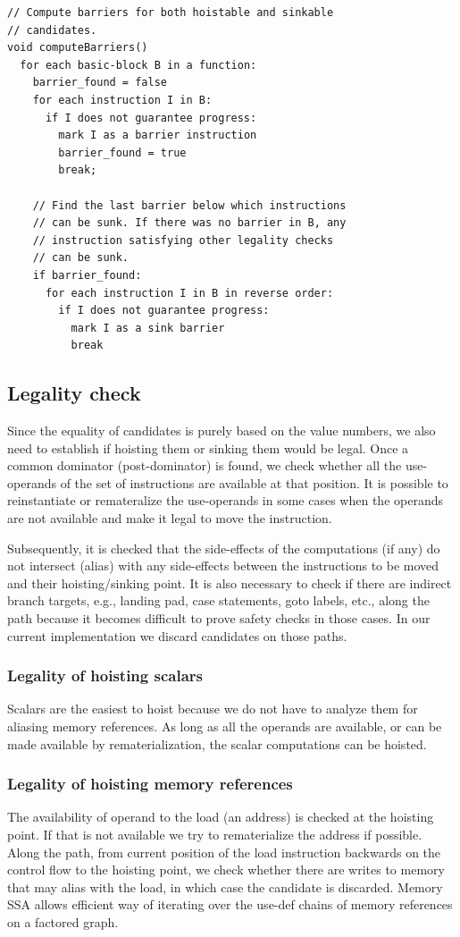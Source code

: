 \documentclass[sigplan,10pt,review,anonymous]{acmart}\settopmatter{printfolios=true,printccs=false,printacmref=false}
\begin{document}
\begin{verbatim}
// Compute barriers for both hoistable and sinkable
// candidates.
void computeBarriers()
  for each basic-block B in a function:
    barrier_found = false
    for each instruction I in B:
      if I does not guarantee progress:
        mark I as a barrier instruction
        barrier_found = true
        break;

    // Find the last barrier below which instructions
    // can be sunk. If there was no barrier in B, any
    // instruction satisfying other legality checks
    // can be sunk.
    if barrier_found:
      for each instruction I in B in reverse order:
        if I does not guarantee progress:
          mark I as a sink barrier
          break
\end{verbatim}

\subsection{Legality check}
\label{subsec:legality}
Since the equality of candidates is purely based on the value numbers, we also
need to establish if hoisting them or sinking them would be legal. Once a common
dominator (post-dominator) is found, we check whether all the use-operands of
the set of instructions are available at that position. It is possible to
reinstantiate or remateralize the use-operands in some cases when the operands
are not available and make it legal to move the instruction.

Subsequently, it is checked that the side-effects of the computations (if any)
do not intersect (alias) with any side-effects between the instructions to be
moved and their hoisting/sinking point. It is also necessary to check if there
are indirect branch targets, e.g., landing pad, case statements, goto labels,
etc., along the path because it becomes difficult to prove safety checks in
those cases. In our current implementation we discard candidates on those paths.

\subsubsection{Legality of hoisting scalars}
Scalars are the easiest to hoist because we do not have to analyze them for
aliasing memory references. As long as all the operands are available, or can be
made available by rematerialization, the scalar computations can be hoisted.

\subsubsection{Legality of hoisting memory references}
The availability of operand to the load (an address) is checked at the hoisting
point. If that is not available we try to rematerialize the address if possible.
Along the path, from current position of the load instruction backwards on the
control flow to the hoisting point, we check whether there are writes to memory
that may alias with the load, in which case the candidate is discarded. Memory
SSA allows efficient way of iterating over the use-def chains of memory
references on a factored graph.
\end{document}
